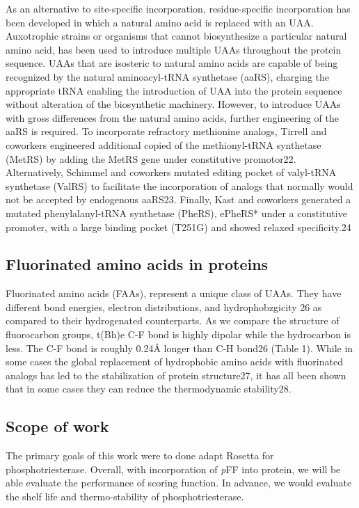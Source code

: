 \begin{refsection}
As an alternative to site-specific incorporation, residue-specific
incorporation has been developed in which a natural amino acid is replaced with
an UAA. Auxotrophic strains or organisms that cannot biosynthesize a particular
natural amino acid, has been used to introduce multiple UAAs throughout the
protein sequence. UAAs that are isosteric to natural amino acids are capable of
being recognized by the natural aminoacyl-tRNA synthetase (aaRS), charging the
appropriate tRNA enabling the introduction of UAA into the protein sequence
without alteration of the biosynthetic machinery. However, to introduce UAAs
with gross differences from the natural amino acids, further engineering of the
aaRS is required. To incorporate refractory methionine analogs, Tirrell and
coworkers engineered additional copied of the methionyl-tRNA synthetase (MetRS)
by adding the MetRS gene under constitutive promotor22. Alternatively, Schimmel
and coworkers mutated editing pocket of valyl-tRNA synthetase (ValRS) to
facilitate the incorporation of analogs that normally would not be accepted by
endogenous aaRS23. Finally, Kast and coworkers generated a mutated
phenylalanyl-tRNA synthetase (PheRS), ePheRS* under a constitutive promoter,
with a large binding pocket (T251G) and showed relaxed specificity.24

\subsection{Fluorinated amino acids in proteins}
\label{sec:faa}


Fluorinated amino acids (FAAs), represent a unique class of UAAs. They have
different bond energies, electron distributions, and hydrophobzgicity 26 as
compared to their hydrogenated counterparts. As we compare the structure of
fluorocarbon groups, t(Bh)e C-F bond is highly dipolar while the hydrocarbon is
less. The C-F bond is roughly 0.24Å longer than C-H bond26 (Table 1). While in
some cases the global replacement of hydrophobic amino acids with fluorinated
analogs has led to the stabilization of protein structure27, it has all been
shown that in some cases they can reduce the thermodynamic stability28.

\subsection{Scope of work}

The primary goals of this work were to done adapt Rosetta for
phosphotriesterase. Overall, with incorporation of \emph{p}FF into protein, we
will be able evaluate the performance of scoring function. In advance, we would
evaluate the shelf life and thermo-stability of phosphotriesterase.


\end{refsection}
